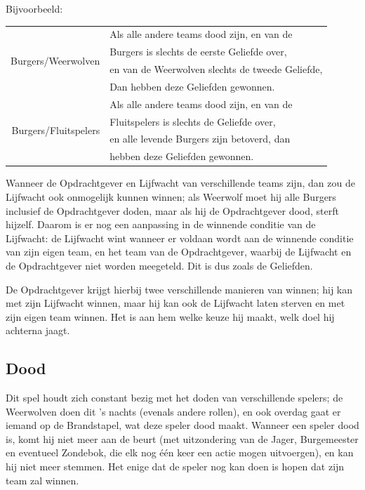 \documentclass[12pt]{article}
\begin{document}
    Bijvoorbeeld:

    \begin{center}
      \begin{tabular}{r|l}
        \multirow{4}{*}{Burgers/Weerwolven}
         & Als alle andere teams dood zijn, en van de \\
         & Burgers is slechts de eerste Geliefde over, \\
         & en van de Weerwolven slechts de tweede Geliefde, \\
         & Dan hebben deze Geliefden gewonnen.\\
        \hline
        \multirow{4}{*}{Burgers/Fluitspelers}
         & Als alle andere teams dood zijn, en van de \\
         & Fluitspelers is slechts de Geliefde over, \\
         & en alle levende Burgers zijn betoverd, dan \\
         & hebben deze Geliefden gewonnen. \\
      \end{tabular}
    \end{center}
    
    Wanneer de Opdrachtgever en Lijfwacht van verschillende teams zijn, dan zou de Lijfwacht ook onmogelijk kunnen winnen; als Weerwolf moet hij alle Burgers inclusief de Opdrachtgever doden, maar als hij de Opdrachtgever dood, sterft hijzelf. Daarom is er nog een aanpassing in de winnende conditie van de Lijfwacht: de Lijfwacht wint wanneer er voldaan wordt aan de winnende conditie van zijn eigen team, en het team van de Opdrachtgever, waarbij de Lijfwacht en de Opdrachtgever niet worden meegeteld. Dit is dus zoals de Geliefden.
    
    De Opdrachtgever krijgt hierbij twee verschillende manieren van winnen; hij kan met zijn Lijfwacht winnen, maar hij kan ook de Lijfwacht laten sterven en met zijn eigen team winnen. Het is aan hem welke keuze hij maakt, welk doel hij achterna jaagt.
    
  \subsection{Dood}
  
    Dit spel houdt zich constant bezig met het doden van verschillende spelers; de Weerwolven doen dit 's nachts (evenals andere rollen), en ook overdag gaat er iemand op de Brandstapel, wat deze speler dood maakt. Wanneer een speler dood is, komt hij niet meer aan de beurt (met uitzondering van de Jager, Burgemeester en eventueel Zondebok, die elk nog \'e\'en keer een actie mogen uitvoergen), en kan hij niet meer stemmen. Het enige dat de speler nog kan doen is hopen dat zijn team zal winnen.
    
\end{document}
